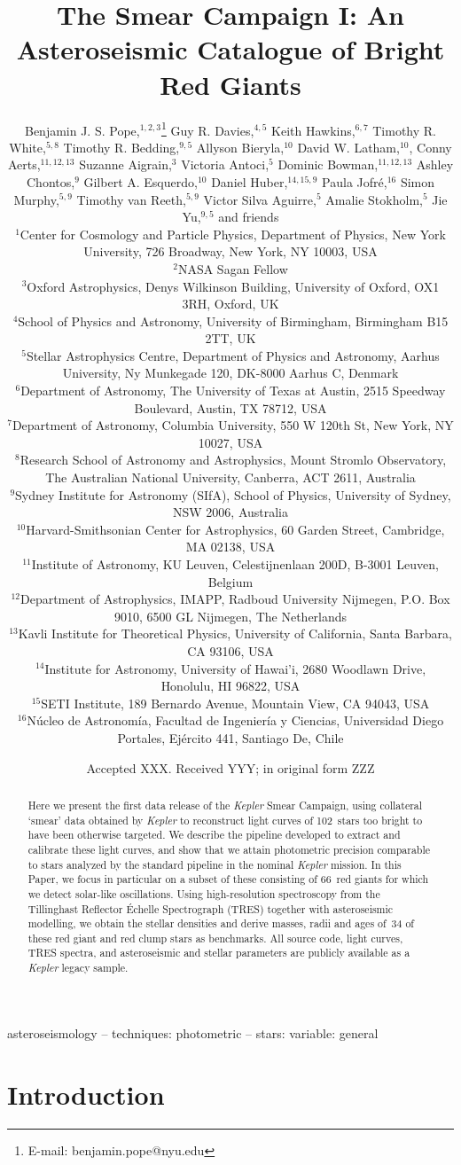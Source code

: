 \documentclass[a4paper,fleqn,usenatbib]{mnras}
\title[The Kepler Smear Campaign]{The \kepler Smear Campaign I: An Asteroseismic Catalogue of Bright Red Giants}
\author[B. J. S. Pope et al.]{Benjamin J. S. Pope,$^{1,2,3}$\thanks{E-mail: benjamin.pope@nyu.edu}
Guy R. Davies,$^{4,5}$
Keith Hawkins,$^{6,7}$
Timothy R. White,$^{5,8}$\newauthor
Timothy R. Bedding,$^{9,5}$
Allyson Bieryla,$^{10}$
David W. Latham,$^{10}$,
Conny Aerts,$^{11,12,13}$\newauthor
Suzanne Aigrain,$^{3}$ 
Victoria Antoci,$^{5}$
Dominic Bowman,$^{11,12,13}$
Ashley Chontos,$^{9}$\newauthor
Gilbert A. Esquerdo,$^{10}$
Daniel Huber,$^{14,15,9}$
Paula Jofr\'{e},$^{16}$
Simon Murphy,$^{5,9}$\newauthor
Timothy van Reeth,$^{5,9}$
Victor Silva Aguirre,$^{5}$
Amalie Stokholm,$^{5}$
Jie Yu,$^{9,5}$ \newauthor
and friends
\\
$^{1}$Center for Cosmology and Particle Physics, Department of Physics, New York University, 726 Broadway, New York, NY 10003, USA\\
$^{2}$NASA Sagan Fellow\\
$^{3}$Oxford Astrophysics, Denys Wilkinson Building, University of Oxford, OX1 3RH, Oxford, UK\\
$^{4}$School of Physics and Astronomy, University of Birmingham, Birmingham B15 2TT, UK\\
$^{5}$Stellar Astrophysics Centre, Department of Physics and Astronomy, Aarhus University, Ny Munkegade 120, DK-8000 Aarhus C, Denmark\\
$^{6}$Department of Astronomy, The University of Texas at Austin, 2515 Speedway Boulevard, Austin, TX 78712, USA\\
$^{7}$Department of Astronomy, Columbia University, 550 W 120th St, New York, NY 10027, USA\\
$^{8}$Research School of Astronomy and Astrophysics, Mount Stromlo Observatory, The Australian National University, Canberra, ACT 2611, Australia\\
$^{9}$Sydney Institute for Astronomy (SIfA), School of Physics, University of Sydney, NSW 2006, Australia\\
$^{10}$Harvard-Smithsonian Center for Astrophysics, 60 Garden Street, Cambridge, MA 02138, USA\\
$^{11}$Institute of Astronomy, KU Leuven, Celestijnenlaan 200D, B-3001 Leuven, Belgium\\
$^{12}$Department of Astrophysics, IMAPP, Radboud University Nijmegen, P.O. Box 9010, 6500 GL Nijmegen, The Netherlands\\
$^{13}$Kavli Institute for Theoretical Physics, University of California, Santa Barbara, CA 93106, USA\\
$^{14}$Institute for Astronomy, University of Hawai'i, 2680 Woodlawn Drive, Honolulu, HI 96822, USA\\
$^{15}$SETI Institute, 189 Bernardo Avenue, Mountain View, CA 94043, USA\\
$^{16}$N\'{u}cleo de Astronom\'{i}a, Facultad de Ingenier\'{i}a y Ciencias, Universidad Diego Portales, Ej\'{e}rcito 441, Santiago De, Chile\\
}
\date{Accepted XXX. Received YYY; in original form ZZZ}
\newcommand{\kepler}{\emph{Kepler}\xspace}
\begin{document}
\label{firstpage}
\pagerange{\pageref{firstpage}--\pageref{lastpage}}
\maketitle

\begin{abstract}
Here we present the first data release of the \kepler Smear Campaign, using collateral `smear' data obtained by \kepler to reconstruct light curves of 102~stars too bright to have been otherwise targeted. We describe the pipeline developed to extract and calibrate these light curves, and show that we attain photometric precision comparable to stars analyzed by the standard pipeline in the nominal \kepler mission. In this Paper, we focus in particular on a subset of these consisting of 66~red giants for which we detect solar-like oscillations. Using high-resolution spectroscopy from the Tillinghast Reflector \'{E}chelle Spectrograph (TRES) together with asteroseismic modelling, we obtain the stellar densities and derive masses, radii and ages of~34 of these red giant and red clump stars as benchmarks. All source code, light curves, TRES spectra, and asteroseismic and stellar parameters are publicly available as a \kepler legacy sample.
\end{abstract}

\begin{keywords}
asteroseismology -- techniques: photometric -- stars: variable: general
\end{keywords}



\section{Introduction}
\label{intro}

\end{document}
